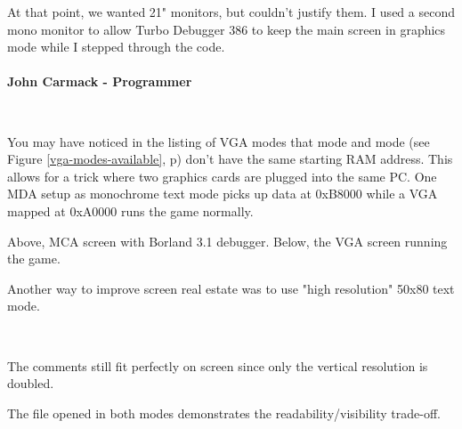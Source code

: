 \documentclass[book.tex]{subfiles}
\begin{document}
\begin{fancyquotes}
At that point, we wanted 21" monitors, but couldn't justify them.  I used a second mono monitor to allow Turbo Debugger 386 to keep the main screen in graphics mode while I stepped through the code.\\
 \\
\textbf{John Carmack - Programmer}
\end{fancyquotes}\\
\par
\vspace{-5pt}
You may have noticed in the listing of VGA modes that mode  and mode  (see Figure \ref{vga-modes-available}, p\pageref{vga-modes-available})  don't have the same starting RAM address. This allows for a trick where two graphics cards are plugged into the same PC. One MDA setup as monochrome text mode picks up data at 0xB8000 while a VGA mapped at 0xA0000 runs the game normally.
      \\
      \par
Above, MCA screen with Borland 3.1 debugger. Below, the VGA screen running the game.\\

\pagebreak
\par

Another way to improve screen real estate was to use "high resolution" 50x80 text mode.\\
\par 
 \\
 \par
 \vspace{-7pt}
The comments still fit perfectly on screen since only the vertical resolution is doubled.\\
\par
\vspace{-4pt}
 The file  opened in both modes demonstrates the readability/visibility trade-off.\\
\par
\end{document}
